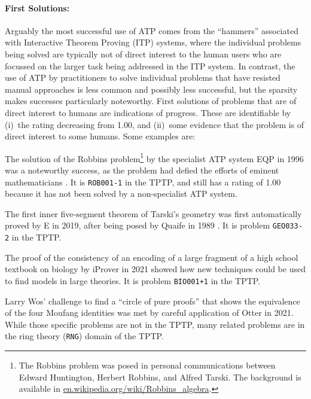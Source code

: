 \documentclass[runningheads]{llncs}
\newenvironment{packed_itemize}{
\vspace*{-0.5em}
\begin{itemize}
\setlength{\partopsep}{0pt}
\setlength{\itemsep}{1pt}
\setlength{\parskip}{0pt}
\setlength{\parsep}{0pt}
}{\end{itemize}}
\begin{document}
\vspace*{-0.5em}
\paragraph{First Solutions:}
Arguably the most successful use of ATP comes from the ``hammers'' \cite{BK+16} associated with 
Interactive Theorem Proving (ITP) systems, where the individual problems being solved are 
typically not of direct interest to the human users who are focussed on the larger task being 
addressed in the ITP system.
In contrast, the use of ATP by practitioners to solve individual problems that have resisted
manual approaches is less common and possibly less successful, but the sparsity makes successes 
particularly noteworthy. 
First solutions of problems that are of direct interest to humans are indications of progress.
These are identifiable by (i)~the rating decreasing from 1.00, and (ii)~some evidence that the 
problem is of direct interest to some humans.
Some examples are:
\begin{packed_itemize}
\item The solution of the Robbins problem\footnote{%
      The Robbins problem was posed in personal communications between Edward Huntington,
      Herbert Robbins, and Alfred Tarski.
      The background is available in 
      \href{https://en.wikipedia.org/wiki/Robbins_algebra}{en.wikipedia.org/wiki/Robbins\_algebra}.}
      by the specialist ATP system EQP \cite{McC97} 
      in 1996 was a noteworthy success, as the problem had defied the efforts of eminent 
      mathematicians \cite{HMT71}.
      It is {\tt ROB001-1} in the TPTP, and still has a rating of 1.00 because it has not
      been solved by a non-specialist ATP system.
\item The first inner five-segment theorem of Tarski's geometry \cite{SST83} was first 
      automatically proved by E \cite{Sch13-LPAR} in 2019, after being posed by Quaife in 
      1989 \cite{Qua89}.
      It is problem {\tt GEO033-2} in the TPTP.
\item The proof of the consistency of an encoding of a large fragment of a high school textbook
      on biology \cite{CDI13} by iProver \cite{Kor08} in 2021 showed how new techniques could
      be used to find models in large theories.
      It is problem {\tt BIO001+1} in the TPTP.
\item Larry Wos' challenge to find a ``circle of pure proofs'' that shows the equivalence
      of the four Moufang identities \cite{Wos19} was met by careful application \cite{Ver22} of
      Otter \cite{McC03-Otter} in 2021.
      While those specific problems are not in the TPTP, many related problems are in the
      ring theory ({\tt RNG}) domain of the TPTP.
\end{packed_itemize}
\end{document}
